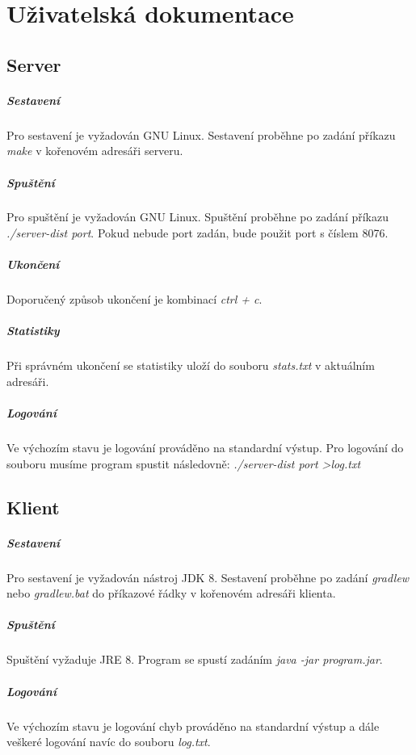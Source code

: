 \documentclass[12pt, a4paper]{report}
\begin{document}
\chapter{Uživatelská dokumentace}
\section{Server}

\paragraph{Sestavení}
Pro sestavení je vyžadován GNU Linux.
Sestavení proběhne po zadání příkazu \emph{make} v kořenovém adresáři serveru.

\paragraph{Spuštění}
Pro spuštění je vyžadován GNU Linux.
Spuštění proběhne po zadání příkazu \emph{./server-dist port}.
Pokud nebude port zadán, bude použit port s číslem 8076.

\paragraph{Ukončení}
Doporučený způsob ukončení je kombinací \emph{ctrl + c}.

\paragraph{Statistiky}
Při správném ukončení se statistiky uloží do souboru \emph{stats.txt} v aktuálním adresáři.

\paragraph{Logování}
Ve výchozím stavu je logování prováděno na standardní výstup. Pro logování do souboru musíme program spustit následovně: \emph{./server-dist port \textgreater log.txt}

\section{Klient}

\paragraph{Sestavení}
Pro sestavení je vyžadován nástroj JDK 8.
Sestavení proběhne po zadání \emph{gradlew} nebo \emph{gradlew.bat} do příkazové řádky v kořenovém adresáři klienta.

\paragraph{Spuštění}
Spuštění vyžaduje JRE 8. Program se spustí zadáním \emph{java -jar program.jar}.

\paragraph{Logování}
Ve výchozím stavu je logování chyb prováděno na standardní výstup a dále veškeré logování navíc do souboru \emph{log.txt}.
\end{document}

